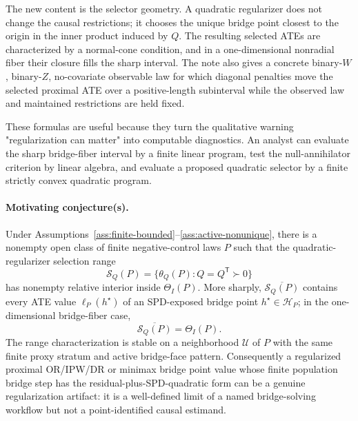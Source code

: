 \documentclass[11pt]{article}
\newcommand{\transpose}{\mathsf{T}}
\newcommand{\calH}{\mathcal{H}}
\theoremstyle{definition}
\theoremstyle{plain}
\theoremstyle{remark}
\begin{document}
The new content is the selector geometry.  A quadratic regularizer does not
change the causal restrictions; it chooses the unique bridge point closest to
the origin in the inner product induced by \(Q\).  The resulting selected
ATEs are characterized by a normal-cone condition, and in a one-dimensional
nonradial fiber their closure fills the sharp interval.  The note also gives
a concrete binary-\(W\), binary-\(Z\), no-covariate observable law for which
diagonal penalties move the selected proximal ATE over a positive-length
subinterval while the observed law and maintained restrictions are held
fixed.

These formulas are useful because they turn the qualitative warning
"regularization can matter" into computable diagnostics.  An analyst can
evaluate the sharp bridge-fiber interval by a finite linear program, test the
null-annihilator criterion by linear algebra, and evaluate a proposed
quadratic selector by a finite strictly convex quadratic program.

\paragraph{Motivating conjecture(s).}
\begin{conjecture}\label{conj:penalty-separation}
Under Assumptions~\ref{ass:finite-bounded}--\ref{ass:active-nonunique}, there
is a nonempty open class of finite negative-control laws \(P\) such that the
quadratic-regularizer selection range
\[
\mathcal S_Q(P)=\{\theta_Q(P):Q=Q^\transpose\succ0\}
\]
has nonempty relative interior inside \(\Theta_I(P)\).  More sharply,
\(\overline{\mathcal S_Q(P)}\) contains every ATE value \(\ell_P(h^\star)\)
of an SPD-exposed bridge point \(h^\star\in\calH_P\); in
the one-dimensional bridge-fiber case,
\[
\overline{\mathcal S_Q(P)}=\Theta_I(P).
\]
The range characterization is stable on a neighborhood \(\mathcal U\) of
\(P\) with the same finite proxy stratum and active bridge-face pattern.
Consequently a regularized proximal OR/IPW/DR or minimax bridge point value
whose finite population bridge step has the residual-plus-SPD-quadratic form
can be a genuine regularization artifact: it is a well-defined limit of a
named bridge-solving workflow but not a point-identified causal estimand.
\end{conjecture}
\end{document}
